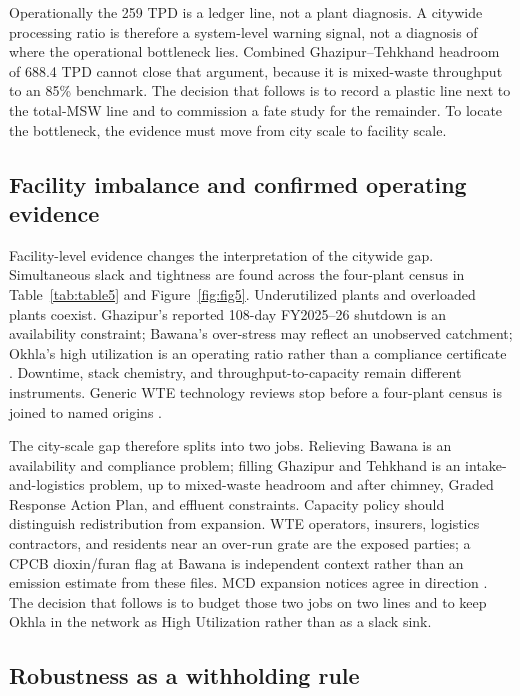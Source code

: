 \documentclass[12pt,a4paper]{article}
\begin{document}
Operationally the 259 TPD is a ledger line, not a plant diagnosis. A citywide processing ratio is therefore a system-level warning signal, not a diagnosis of where the operational bottleneck lies. Combined Ghazipur--Tehkhand headroom of 688.4 TPD cannot close that argument, because it is mixed-waste throughput to an 85\% benchmark. The decision that follows is to record a plastic line next to the total-MSW line and to commission a fate study for the remainder. To locate the bottleneck, the evidence must move from city scale to facility scale.

\subsection{Facility imbalance and confirmed operating evidence}

Facility-level evidence changes the interpretation of the citywide gap. Simultaneous slack and tightness are found across the four-plant census in Table~\ref{tab:table5} and Figure~\ref{fig:fig5}. Underutilized plants and overloaded plants coexist. Ghazipur's reported 108-day FY2025--26 shutdown is an availability constraint; Bawana's over-stress may reflect an unobserved catchment; Okhla's high utilization is an operating ratio rather than a compliance certificate \citep{ht_ghazipur_shutdown_2026,ht_cpcb_affidavit_2026}. Downtime, stack chemistry, and throughput-to-capacity remain different instruments. Generic WTE technology reviews stop before a four-plant census is joined to named origins \citep{sciencedirect_wte_india_review_2014,springer_msw_wte_india_overview_2017}.

The city-scale gap therefore splits into two jobs. Relieving Bawana is an availability and compliance problem; filling Ghazipur and Tehkhand is an intake-and-logistics problem, up to mixed-waste headroom and after chimney, Graded Response Action Plan, and effluent constraints. Capacity policy should distinguish redistribution from expansion. WTE operators, insurers, logistics contractors, and residents near an over-run grate are the exposed parties; a CPCB dioxin/furan flag at Bawana is independent context rather than an emission estimate from these files. MCD expansion notices agree in direction \citep{nie_mcd_four_plants_2025,toi_tehkhand_expansion_2026}. The decision that follows is to budget those two jobs on two lines and to keep Okhla in the network as High Utilization rather than as a slack sink.

\subsection{Robustness as a withholding rule}
\end{document}
